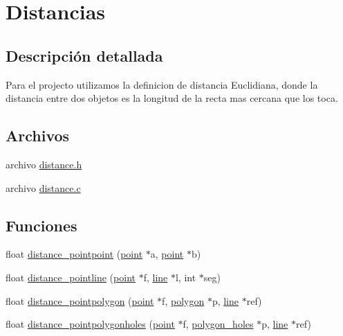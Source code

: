 \hypertarget{group__distance}{
\section{Distancias}
\label{group__distance}
}


\subsection{Descripci\'{o}n detallada}
Para el projecto utilizamos la definicion de distancia Euclidiana, donde la distancia entre dos objetos es la longitud de la recta mas cercana que los toca. 

\subsection*{Archivos}
\begin{CompactItemize}
\item 
archivo \hyperlink{distance_8h}{distance.h}
\item 
archivo \hyperlink{distance_8c}{distance.c}
\end{CompactItemize}
\subsection*{Funciones}
\begin{CompactItemize}
\item 
float \hyperlink{group__distance_g3b2b03f846e6b587be683ec8b853e774_g3b2b03f846e6b587be683ec8b853e774}{distance\_\-pointpoint} (\hyperlink{struct__point}{point} $\ast$a, \hyperlink{struct__point}{point} $\ast$b)
\item 
float \hyperlink{group__distance_g69a59a49134b784b0c8797e0e83e7c40_g69a59a49134b784b0c8797e0e83e7c40}{distance\_\-pointline} (\hyperlink{struct__point}{point} $\ast$f, \hyperlink{struct__line}{line} $\ast$l, int $\ast$seg)
\item 
float \hyperlink{group__distance_g25716e8d1c8abaf08903bbcd08b8d6e5_g25716e8d1c8abaf08903bbcd08b8d6e5}{distance\_\-pointpolygon} (\hyperlink{struct__point}{point} $\ast$f, \hyperlink{struct__polygon}{polygon} $\ast$p, \hyperlink{struct__line}{line} $\ast$ref)
\item 
float \hyperlink{group__distance_gc837f0084791f42936ade857a0cce3af_gc837f0084791f42936ade857a0cce3af}{distance\_\-pointpolygonholes} (\hyperlink{struct__point}{point} $\ast$f, \hyperlink{struct__polygon__holes}{polygon\_\-holes} $\ast$p, \hyperlink{struct__line}{line} $\ast$ref)
\end{CompactItemize}


